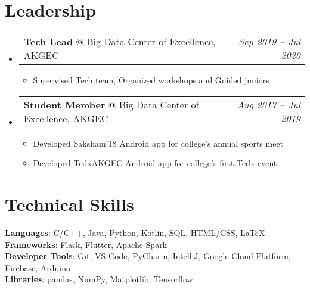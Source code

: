 \documentclass[letterpaper,11pt]{article}
\makeatletter
\newcommand{\resumeItem}[1]{
  \item\small{
    {#1 \vspace{-2pt}}
  }
}
\newcommand{\resumeLeadershipRole}[3]{
  \vspace{-2pt}\item
    \begin{tabular*}{0.97\textwidth}[t]{l@{\extracolsep{\fill}}r}
      \textbf{#1} @ #2 & \textit{\small #3} \\
    \end{tabular*}\vspace{-7pt}
}
\newcommand{\resumeSubHeadingListStart}{\begin{itemize}[leftmargin=0.15in, label={}]}
\newcommand{\resumeSubHeadingListEnd}{\end{itemize}}
\newcommand{\resumeItemListStart}{\begin{itemize}}
\newcommand{\resumeItemListEnd}{\end{itemize}\vspace{-5pt}}
\makeatother
\begin{document}
\section{Leadership}
    \resumeSubHeadingListStart

      \resumeLeadershipRole
        {Tech Lead}{Big Data Center of Excellence, AKGEC}{Sep 2019 -- Jul 2020}
        \resumeItemListStart
            \resumeItem{Supervised Tech team, Organized workshops and Guided juniors}
        \resumeItemListEnd

      \resumeLeadershipRole
        {Student  Member}{Big Data Center of Excellence, AKGEC}{Aug 2017 -- Jul 2019}
        \resumeItemListStart
           \resumeItem{Developed Saksham'18 Android app for college's annual sports meet}
           \resumeItem{Developed TedxAKGEC Android app for college's first Tedx event.}
        \resumeItemListEnd
    
    \resumeSubHeadingListEnd


\section{Technical Skills}
 \begin{itemize}[leftmargin=0.15in, label={}]
    \small{\item{
     \textbf{Languages}{: C/C++, Java, Python, Kotlin, SQL, HTML/CSS, LaTeX} \\
     \textbf{Frameworks}{: Flask, Flutter, Apache Spark} \\
     \textbf{Developer Tools}{: Git, VS Code, PyCharm, IntelliJ, Google Cloud Platform, Firebase, Arduino} \\
     \textbf{Libraries}{: pandas, NumPy, Matplotlib, Tensorflow}
    }}
 \end{itemize}


\end{document}
